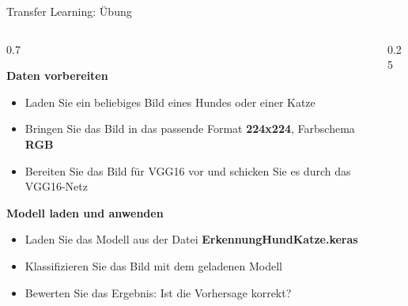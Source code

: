 \begin{frame}{Transfer Learning: Übung}
\begin{columns}
\begin{column}{0.7\textwidth}

\textbf{Daten vorbereiten}
\begin{itemize}
  \item Laden Sie ein beliebiges Bild eines Hundes oder einer Katze
  \item Bringen Sie das Bild in das passende Format \textbf{224x224}, Farbschema \textbf{RGB}
  \item Bereiten Sie das Bild für VGG16 vor und schicken Sie es durch das VGG16-Netz
\end{itemize}
\vfill
\textbf{Modell laden und anwenden}
\begin{itemize}
  \item Laden Sie das Modell aus der Datei \textbf{ErkennungHundKatze.keras}
  \item Klassifizieren Sie das Bild mit dem geladenen Modell
  \item Bewerten Sie das Ergebnis: Ist die Vorhersage korrekt?
\end{itemize}
\end{column}
\begin{column}{0.25\textwidth}
\begin{center}
\end{center}
\end{column}
\end{columns}
\end{frame}

\makequestionspage{\FRAGENIMAGE}